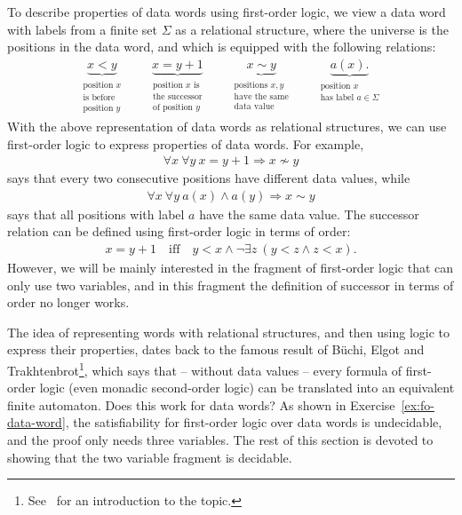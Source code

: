 To describe properties of data words using first-order logic, we view a data word with labels from a finite set $\Sigma$ as a relational structure, where the universe is the positions in the data word, and which is equipped with the following relations:
\begin{align*}
	\underbrace{x < y }_{\substack{\text{position $x$}\\ \text{is before}\\ \text{position $y$}}} \qquad \underbrace{x = y+1 }_{\substack{\text{position $x$ is }\\ \text{the successor}\\ \text{of position $y$}}} \qquad \underbrace{x \sim y }_{\substack{\text{positions $x,y$}\\ \text{have the same}\\ \text{data value}}} \qquad \underbrace{a(x).}_{\substack{\text{position $x$}\\ \text{has label $a \in \Sigma$}}}
\end{align*}
With the above representation of data words as relational structures, we can use first-order logic to express properties of data words. 
For example, 
\begin{align*}
	\forall x \ \forall y \ x =y +1 \Rightarrow x \not \sim y
\end{align*}
says that every two consecutive positions have different data values, while
\begin{align*}
	\forall x \ \forall y \ a(x) \land a(y) \Rightarrow x \sim y
\end{align*}
says that all positions with label $a$ have the same data value. The successor relation can be defined using first-order logic in terms of order:
\begin{align*}
x = y+1 \quad \text{iff} \quad 	y < x \land \neg \exists z \ (y < z \land z < x).
\end{align*}
However, we will be mainly interested in the fragment of first-order logic that can only use two variables, and in this fragment the definition of successor in terms of order no longer works.

The idea of representing words with relational structures, and then using logic to express their properties, dates back to the famous result of B\"uchi, Elgot and Trakhtenbrot\footnote{See~\cite{DBLP:reference/hfl/Thomas97} for an introduction to the topic.}, which says that -- without data values -- every formula of first-order logic (even monadic second-order logic) can be translated into an equivalent finite automaton. Does this work for data words? As shown in Exercise~\ref{ex:fo-data-word}, the satisfiability for first-order logic over data words is undecidable, and the proof only needs three variables. The rest of this section is devoted to showing that the two variable fragment is decidable.

